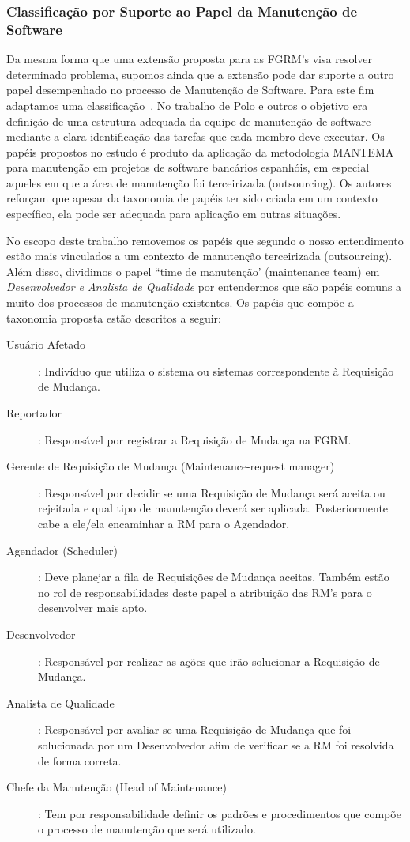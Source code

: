 \subsubsection{Classificação por Suporte ao Papel da Manutenção de Software}
\label{subsubsec:map-esquema-suporte-papel-man}

Da mesma forma que uma extensão proposta para as FGRM's visa resolver
determinado problema, supomos ainda que a extensão pode dar suporte a outro
papel desempenhado no processo de Manutenção de Software. Para este fim
adaptamos uma classificação~\cite{Polo1999}. No trabalho de Polo e outros o
objetivo era definição de uma estrutura adequada da equipe de manutenção de
software mediante a clara identificação das tarefas que cada membro deve
executar. Os papéis propostos no estudo é produto da aplicação da metodologia
MANTEMA~\cite{756695} para manutenção em projetos de software bancários
espanhóis, em especial aqueles em que a área de manutenção foi terceirizada
(outsourcing). Os autores reforçam que apesar da taxonomia de papéis ter sido
criada em um contexto específico, ela pode ser adequada para aplicação em outras
situações.

No escopo deste trabalho removemos os papéis que segundo o nosso entendimento
estão mais vinculados a um contexto de manutenção terceirizada (outsourcing).
Além disso, dividimos o papel ``time de manutenção' (maintenance team) em
\textit{Desenvolvedor e Analista de Qualidade} por entendermos que são papéis
comuns a muito dos processos de manutenção existentes. Os papéis que compõe a
taxonomia proposta estão descritos a seguir:

\begin{description} 
	\item[Usuário Afetado]: Indivíduo que utiliza o sistema ou sistemas
		correspondente à Re\-qui\-si\-ção de Mudança.
   	\item[Reportador]:
		Responsável por registrar a Requisição de Mudança na FGRM\@.
	\item[Gerente de Requisição de Mudança (Maintenance-request manager)]:
		Res\-pon\-sá\-vel por decidir se uma Requisição de Mudança será aceita ou
		rejeitada e qual tipo de manutenção deverá ser aplicada. Posteriormente
		cabe a ele/ela encaminhar a RM para o Agendador. 
   	\item[Agendador
		(Scheduler)]: Deve planejar a fila de Requisições de Mudança aceitas.
		Também estão no rol de responsabilidades deste papel a atribuição das
		RM's para o desenvolver mais apto.
  	\item[Desenvolvedor]: Responsável por
		realizar as ações que irão solucionar a Requisição de Mudança.
	\item[Analista de Qualidade]: Responsável por avaliar se uma Requisição de Mudança que foi
		solucionada por um Desenvolvedor afim de verificar se a RM foi resolvida
		de forma correta.
  	\item[Chefe da Manutenção (Head of
		Maintenance)]: Tem por responsabilidade definir os padrões e
		procedimentos que compõe o processo de manutenção que será utilizado.
\end{description}


